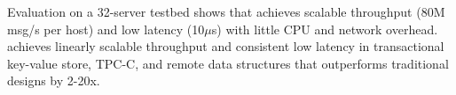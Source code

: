 Evaluation on a 32-server testbed shows that \sys achieves scalable throughput (80M msg/s per host) and low latency (10$\mu$s) with little CPU and network overhead.
\sys{} achieves linearly scalable throughput and consistent low latency in transactional key-value store, TPC-C, and remote data structures that outperforms traditional designs by 2-20x.








